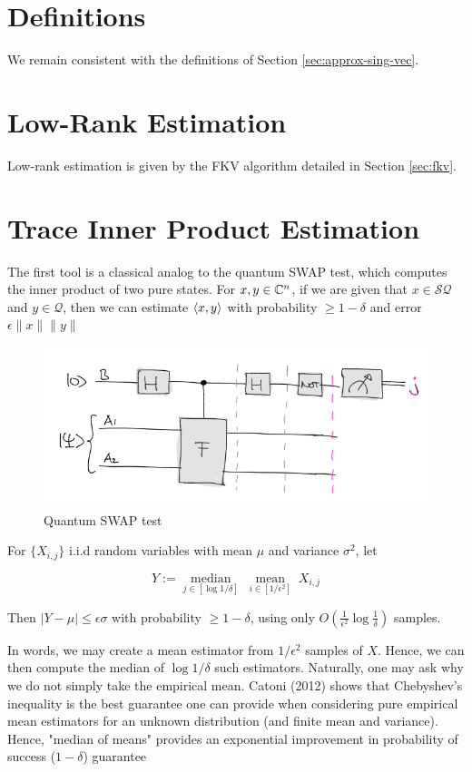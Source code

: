 \documentclass[main.tex]{subfiles}
\begin{document}
\section{Definitions}

We remain consistent with the definitions of Section \ref{sec:approx-sing-vec}.

\section{Low-Rank Estimation}

Low-rank estimation is given by the FKV algorithm detailed in Section \ref{sec:fkv}.

\section{Trace Inner Product Estimation}

The first tool is a classical analog to the quantum SWAP test, which computes the inner product of two pure states. For $x, y \in \mathbb{C}^n$, if we are given that $x \in \mathcal{SQ}$ and $y \in \mathcal{Q}$, then we can estimate $\langle x, y\rangle$ with probability $\geq 1 - \delta$ and error $\epsilon \|x\|\|y\|$ 

\begin{figure}
\includegraphics[width= 0.5\linewidth]{images/swap_test.png}	
\caption{Quantum SWAP test}
\end{figure}

\begin{fact} For $\{X_{i,j}\}$ i.i.d random variables with mean $\mu$ and variance $\sigma^2$, let 

$$Y := \underset{j \in [\log 1/\delta]}{\operatorname{median}}\;\underset{i \in [1/\epsilon^2]}{\operatorname{mean}}\;X_{i,j}$$

Then $\vert Y - \mu\vert \leq \epsilon\sigma$ with probability $\geq 1-\delta$, using only $O(\frac{1}{\epsilon^2}\log\frac{1}{\delta})$ samples.
\end{fact}

In words, we may create a mean estimator from $1/\epsilon^2$ samples of $X$. Hence, we can then compute the median of $\log 1/\delta$ such estimators. Naturally, one may ask why we do not simply take the empirical mean. Catoni (2012) shows that Chebyshev's inequality is the best guarantee one can provide when considering pure empirical mean estimators for an unknown distribution (and finite mean and variance). Hence, "median of means" provides an exponential improvement in probability of success ($1 - \delta$) guarantee
\end{document}
